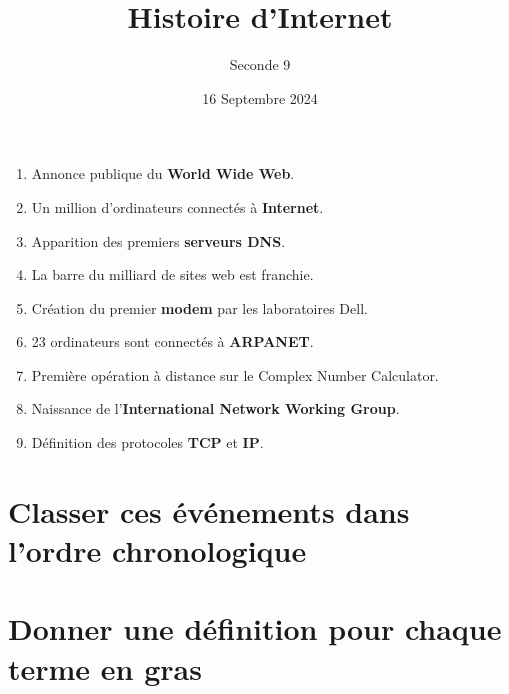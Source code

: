 \documentclass{exam}
\title{Histoire d'Internet}
\date{16 Septembre 2024}
\author{Seconde 9}
\begin{document}
\maketitle

\begin{enumerate}
\item Annonce publique du \textbf{World Wide Web}.
\item Un million d'ordinateurs connectés à \textbf{Internet}.
\item Apparition des premiers \textbf{serveurs DNS}.
\item La barre du milliard de sites web est franchie.
\item Création du premier \textbf{modem} par les laboratoires Dell. 
\item 23 ordinateurs sont connectés à \textbf{ARPANET}.
\item Première opération à distance sur le Complex Number Calculator.
\item Naissance de l'\textbf{International Network Working Group}.
\item Définition des protocoles \textbf{TCP} et \textbf{IP}.
\end{enumerate}
\vspace{1cm}
\begin{minipage}{0.45\textwidth}
\section{Classer ces événements dans l'ordre chronologique}
\makeemptybox{9cm}
\end{minipage}
\hfill\vline\hfill
\begin{minipage}{0.45\textwidth}
\section{Donner une définition pour chaque terme en gras}
\makeemptybox{9cm}
\end{minipage}
\end{document}
